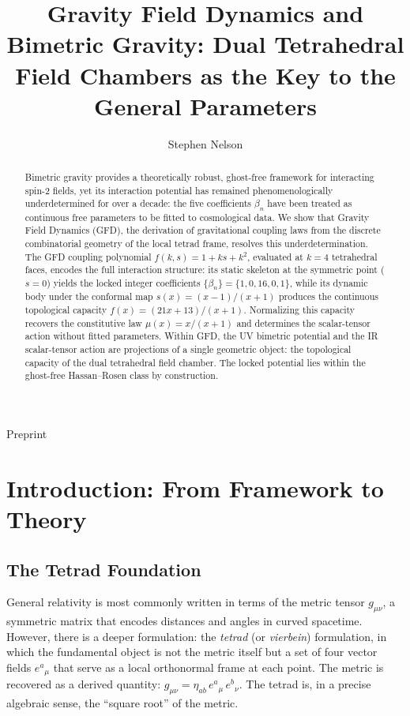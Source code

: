 \documentclass[twocolumn]{iopjournal}
\renewcommand{\articletype}[1]{%
  {\vspace*{-8mm}\noindent \Large \sf Preprint}\par
  \vspace*{6mm}\noindent{\scriptsize \sf{\bfseries \MakeUppercase{#1}}}}
\begin{document}
\articletype{Letter}

\title{Gravity Field Dynamics and Bimetric Gravity: Dual Tetrahedral Field Chambers as the Key to the General Parameters}

\author{Stephen Nelson}


\begin{abstract}
Bimetric gravity provides a theoretically robust, ghost-free framework for interacting spin-2 fields, yet its interaction potential has remained phenomenologically underdetermined for over a decade: the five coefficients $\beta_n$ have been treated as continuous free parameters to be fitted to cosmological data. We show that Gravity Field Dynamics (GFD), the derivation of gravitational coupling laws from the discrete combinatorial geometry of the local tetrad frame, resolves this underdetermination. The GFD coupling polynomial $f(k,s) = 1 + ks + k^2$, evaluated at $k = 4$ tetrahedral faces, encodes the full interaction structure: its static skeleton at the symmetric point ($s = 0$) yields the locked integer coefficients $\{\beta_n\} = \{1, 0, 16, 0, 1\}$, while its dynamic body under the conformal map $s(x) = (x-1)/(x+1)$ produces the continuous topological capacity $f(x) = (21x + 13)/(x + 1)$. Normalizing this capacity recovers the constitutive law $\mu(x) = x/(x+1)$ and determines the scalar-tensor action without fitted parameters. Within GFD, the UV bimetric potential and the IR scalar-tensor action are projections of a single geometric object: the topological capacity of the dual tetrahedral field chamber. The locked potential lies within the ghost-free Hassan--Rosen class by construction.
\end{abstract}


\section*{Introduction: From Framework to Theory}

\subsection*{The Tetrad Foundation}

General relativity is most commonly written in terms of the metric tensor $g_{\mu\nu}$, a symmetric matrix that encodes distances and angles in curved spacetime. However, there is a deeper formulation: the \emph{tetrad} (or \emph{vierbein}) formulation, in which the fundamental object is not the metric itself but a set of four vector fields $e^a{}_\mu$ that serve as a local orthonormal frame at each point. The metric is recovered as a derived quantity: $g_{\mu\nu} = \eta_{ab}\, e^a{}_\mu\, e^b{}_\nu$. The tetrad is, in a precise algebraic sense, the ``square root'' of the metric.
\end{document}
